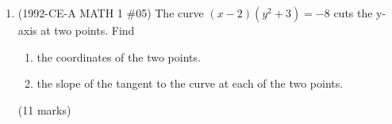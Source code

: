 \documentclass[12pt]{article}
\begin{document}
\begin{enumerate}
            \hrulefill
            
            \hrulefill
            
            \hrulefill
            
            \hrulefill
            
            \hrulefill
            
            \hrulefill
            
            \hrulefill
            
            \hrulefill
            
            \hrulefill
            
            \hrulefill
            
            \hrulefill
            
            \hrulefill
            
            \hrulefill
            
            \hrulefill
            
            \hrulefill
            
            \hrulefill
            
            \hrulefill
            
            \hrulefill
            
            \hrulefill
            
            \hrulefill
            
            \hrulefill

        \pagebreak
        \item (1992-CE-A MATH 1 \#05) The curve $(x-2)(y^2+3)=-8$ cuts the y-axis at two points. Find\begin{enumerate}
            \item the coordinates of the two points.
            \item the slope of the tangent to the curve at each of the two points.
        \end{enumerate}\hfill(11 marks)
        
        \hrulefill
            
            \hrulefill
            
            \hrulefill
            
            \hrulefill
            
            \hrulefill
            
            \hrulefill
            
            \hrulefill
            

\end{enumerate}
\end{document}
